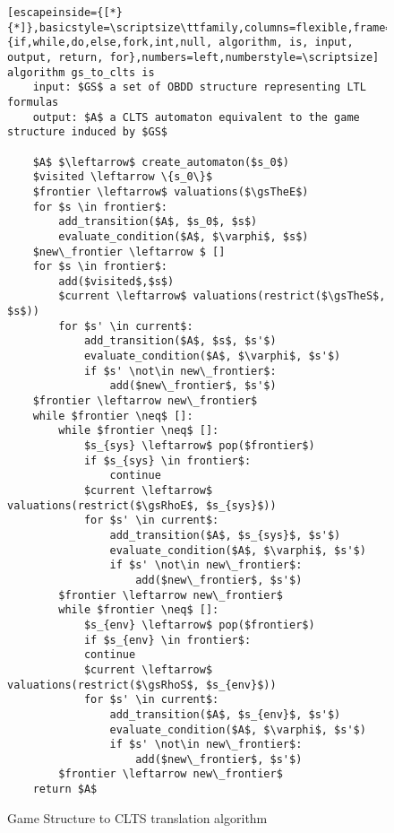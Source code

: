 \renewcommand{\ttdefault}{pcr}
\begin{figure}[H]
\begin{lstlisting}[escapeinside={[*}{*]},basicstyle=\scriptsize\ttfamily,columns=flexible,frame=lines,mathescape=true,xleftmargin=3.0ex,keywordstyle=\textbf,morekeywords={if,while,do,else,fork,int,null, algorithm, is, input, output, return, for},numbers=left,numberstyle=\scriptsize]
algorithm gs_to_clts is
	input: $GS$ a set of OBDD structure representing LTL formulas
	output: $A$ a CLTS automaton equivalent to the game structure induced by $GS$
	
	$A$ $\leftarrow$ create_automaton($s_0$)
	$visited \leftarrow \{s_0\}$ 
	$frontier \leftarrow$ valuations($\gsTheE$)
	for $s \in frontier$:
		add_transition($A$, $s_0$, $s$)
		evaluate_condition($A$, $\varphi$, $s$)		
	$new\_frontier \leftarrow $ [] 
	for $s \in frontier$:
		add($visited$,$s$)
		$current \leftarrow$ valuations(restrict($\gsTheS$, $s$))
		for $s' \in current$:
			add_transition($A$, $s$, $s'$)
			evaluate_condition($A$, $\varphi$, $s'$)
			if $s' \not\in new\_frontier$:			
				add($new\_frontier$, $s'$)
	$frontier \leftarrow new\_frontier$
	while $frontier \neq$ []:
		while $frontier \neq$ []:		
			$s_{sys} \leftarrow$ pop($frontier$)
			if $s_{sys} \in frontier$:
				continue
			$current \leftarrow$ valuations(restrict($\gsRhoE$, $s_{sys}$))
			for $s' \in current$:
				add_transition($A$, $s_{sys}$, $s'$)
				evaluate_condition($A$, $\varphi$, $s'$)			
				if $s' \not\in new\_frontier$:			
					add($new\_frontier$, $s'$)				
		$frontier \leftarrow new\_frontier$		
		while $frontier \neq$ []:		
			$s_{env} \leftarrow$ pop($frontier$)
			if $s_{env} \in frontier$:
			continue
			$current \leftarrow$ valuations(restrict($\gsRhoS$, $s_{env}$))
			for $s' \in current$:
				add_transition($A$, $s_{env}$, $s'$)
				evaluate_condition($A$, $\varphi$, $s'$)			
				if $s' \not\in new\_frontier$:			
					add($new\_frontier$, $s'$)				
		$frontier \leftarrow new\_frontier$				
	return $A$
\end{lstlisting}
\caption{Game Structure to CLTS translation algorithm}
\label{fig:gs_to_clts_algorithm}
\MediumPicture
\end{figure}
